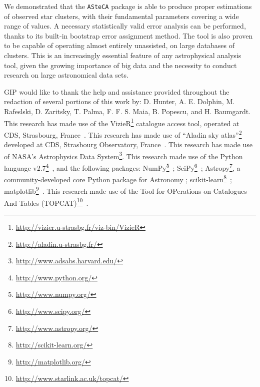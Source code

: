 \documentclass[draft]{aa}
\begin{document}
We demonstrated that the \texttt{ASteCA} package is able to produce proper
estimations of observed star clusters, with their fundamental parameters
covering a wide range of values. A necessary statistically valid error analysis
can be performed, thanks to its built-in bootstrap error assignment method.
%
The tool is also proven to be capable of operating almost entirely unassisted,
on large databases of clusters. This is an increasingly essential feature
of any astrophysical analysis tool, given the growing importance of big data and
the necessity to conduct research on large astronomical data sets.





\begin{acknowledgements}
GIP would like to thank the help and assistance provided throughout the
redaction of several portions of this work by: D. Hunter, A. E. Dolphin,
M. Rafeslski, D. Zaritsky, T. Palma, F. F. S. Maia, B. Popescu,
and H. Baumgardt.
%
This research has made use of the
VizieR\footnote{\url{http://vizier.u-strasbg.fr/viz-bin/VizieR}} catalogue
access tool, operated at CDS, Strasbourg, France~\citep{Ochsenbein_2000}.
%
This research has made use of
``Aladin sky atlas''\footnote{\url{http://aladin.u-strasbg.fr/}} developed at
CDS, Strasbourg Observatory, France~\citep{Bonnarel2000,Boch2014}.
%
This research has made use of NASA's Astrophysics Data
System\footnote{\url{http://www.adsabs.harvard.edu/}}.
%
This research made use of
the Python language v2.7\footnote{\url{http://www.python.org/}}~\citep
{vanRossum_1995},
and the following packages:
NumPy\footnote{\url{http://www.numpy.org/}}~\citep{vanDerWalt_2011};
SciPy\footnote{\url{http://www.scipy.org/}}~\citep{Jones_2001};
Astropy\footnote{\url{http://www.astropy.org/}}, a community-developed core Python
package for Astronomy \citep{Astropy_2013};
scikit-learn\footnote{\url{http://scikit-learn.org/}}~\citep{pedregosa_2011};
matplotlib\footnote{\url{http://matplotlib.org/}}~\citep{hunter_2007}.
%
This research made use of the Tool for OPerations on Catalogues And
Tables (TOPCAT)\footnote{\url{http://www.starlink.ac.uk/topcat/}}~\citep{Taylor_2005}.
\end{acknowledgements}

\end{document}
